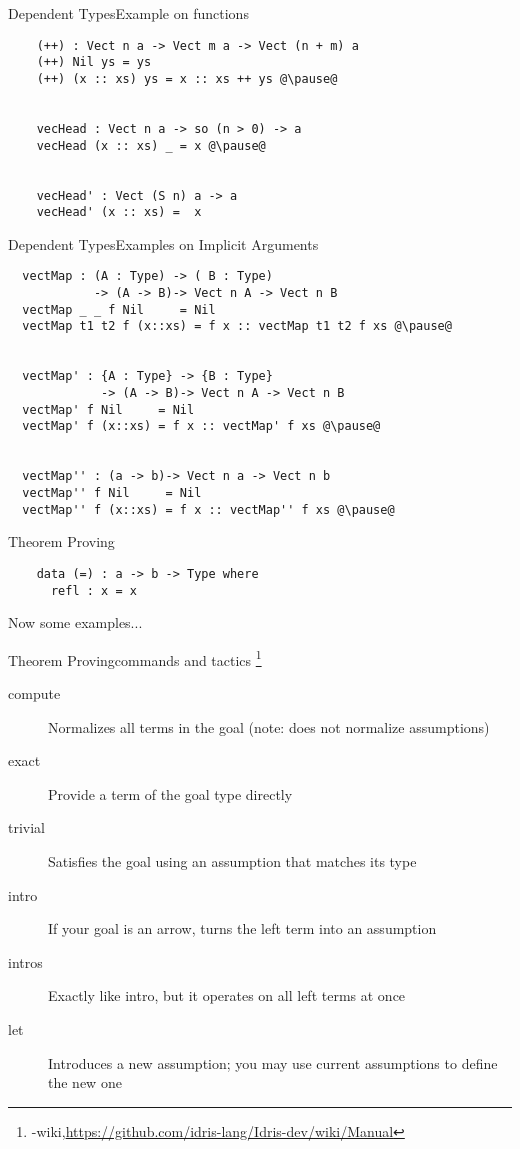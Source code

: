 \documentclass[rail]{beamer}
\begin{document}
\begin{frame}[fragile]{Dependent Types}{Example on functions}
  \begin{lstlisting}
    (++) : Vect n a -> Vect m a -> Vect (n + m) a
    (++) Nil ys = ys
    (++) (x :: xs) ys = x :: xs ++ ys @\pause@


    vecHead : Vect n a -> so (n > 0) -> a
    vecHead (x :: xs) _ = x @\pause@


    vecHead' : Vect (S n) a -> a
    vecHead' (x :: xs) =  x
  \end{lstlisting}
\end{frame}

\begin{frame}[fragile]{Dependent Types}{Examples on Implicit Arguments}
  \begin{lstlisting}
  vectMap : (A : Type) -> ( B : Type)
            -> (A -> B)-> Vect n A -> Vect n B
  vectMap _ _ f Nil     = Nil
  vectMap t1 t2 f (x::xs) = f x :: vectMap t1 t2 f xs @\pause@


  vectMap' : {A : Type} -> {B : Type}
             -> (A -> B)-> Vect n A -> Vect n B
  vectMap' f Nil     = Nil
  vectMap' f (x::xs) = f x :: vectMap' f xs @\pause@


  vectMap'' : (a -> b)-> Vect n a -> Vect n b
  vectMap'' f Nil     = Nil
  vectMap'' f (x::xs) = f x :: vectMap'' f xs @\pause@
  \end{lstlisting}
\end{frame}

\begin{frame}[fragile]{Theorem Proving}
  \begin{lstlisting}
    data (=) : a -> b -> Type where
      refl : x = x
  \end{lstlisting}
  \pause
  Now some examples...
\end{frame}
\begin{frame}{Theorem Proving}{commands and tactics
    \footnote[frame,1]
    {\idris-wiki,\url{https://github.com/idris-lang/Idris-dev/wiki/Manual}}}
  \begin{description}
  \item[compute] Normalizes all terms in the goal (note: does not
    normalize assumptions)
  \item[exact] Provide a term of the goal type directly
  \item[trivial] Satisfies the goal using an assumption that
    matches its type
  \item[intro] If your goal is an arrow, turns the left term into
    an assumption
  \item[intros] Exactly like intro, but it operates on all left
    terms at once
  \item[let] Introduces a new assumption; you may use current
    assumptions to define the new one
  \end{description}
\end{frame}
\end{document}
